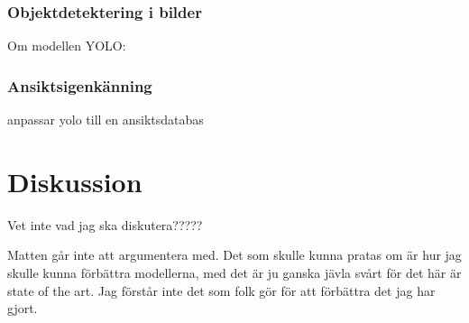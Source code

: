 \documentclass[a4paper,11pt,twoside]{article}
\begin{document}
\subsubsection{Objektdetektering i bilder}
Om modellen YOLO:

\subsubsection{Ansiktsigenkänning}
anpassar yolo till en ansiktsdatabas

\section{Diskussion}
Vet inte vad jag ska diskutera?????

Matten går inte att argumentera med. Det som skulle kunna pratas om är hur jag skulle kunna förbättra modellerna, med det är ju ganska jävla svårt för det här är state of the art. Jag förstår inte det som folk gör för att förbättra det jag har gjort.
\end{document}
